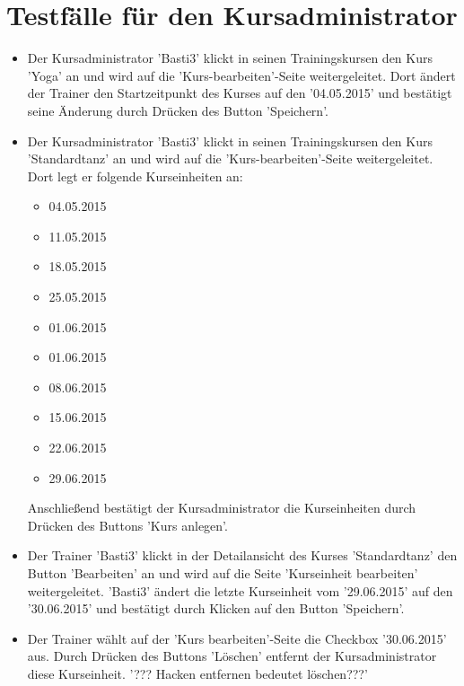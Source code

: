 \documentclass[a4paper]{scrreprt}
\newcounter{Lc}
\newcounter{Hc}
\newcommand{\stepHc}{\stepcounter{Hc}\setcounter{Lc}{0}}
\begin{document}
	\section{Testfälle für den Kursadministrator}
		\stepHc
		\begin{itemize}
			\item {} 
			Der Kursadministrator 'Basti3' klickt in seinen Trainingskursen den Kurs 'Yoga' an und wird auf die 'Kurs-bearbeiten'-Seite weitergeleitet. Dort ändert der Trainer den Startzeitpunkt des Kurses auf den '04.05.2015' und bestätigt seine Änderung durch Drücken des Button 'Speichern'.
				
			\item {} 
			Der Kursadministrator 'Basti3' klickt in seinen Trainingskursen den Kurs 'Standardtanz' an und wird auf die 'Kurs-bearbeiten'-Seite weitergeleitet. Dort legt er folgende Kurseinheiten an:
				\begin{itemize}
					\item 04.05.2015
					\item 11.05.2015
					\item 18.05.2015
					\item 25.05.2015
					\item 01.06.2015
					\item 01.06.2015
					\item 08.06.2015
					\item 15.06.2015
					\item 22.06.2015
					\item 29.06.2015
				\end{itemize}	
			Anschließend bestätigt der Kursadministrator die Kurseinheiten durch Drücken des Buttons 'Kurs anlegen'.
			
			\item {}
			Der Trainer 'Basti3' klickt in der Detailansicht des Kurses 'Standardtanz' den Button 'Bearbeiten' an und wird auf die Seite 'Kurseinheit bearbeiten' weitergeleitet. 'Basti3' ändert die letzte Kurseinheit vom '29.06.2015' auf den '30.06.2015' und bestätigt durch Klicken auf den Button 'Speichern'.
			
			\item {}
			Der Trainer wählt auf der 'Kurs bearbeiten'-Seite die Checkbox '30.06.2015' aus. Durch Drücken des Buttons 'Löschen' entfernt der Kursadministrator diese Kurseinheit. '??? Hacken entfernen  bedeutet löschen???'			
		\end{itemize}
		
\end{document}
